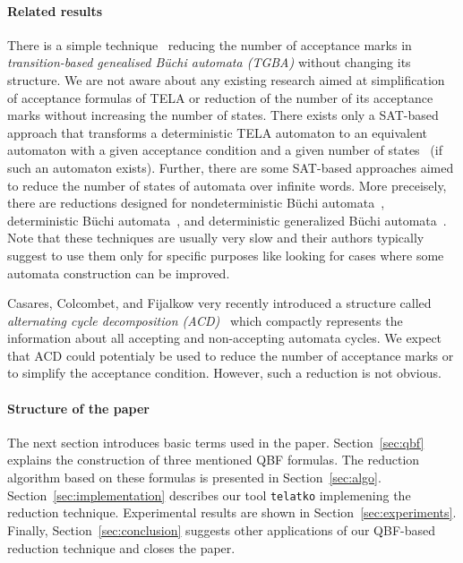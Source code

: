\documentclass[a4paper,UKenglish,cleveref,autoref,thm-restate]{lipics-v2021}
\newcommand{\telatko}{\texttt{telatko}\xspace}
\begin{document}
\paragraph*{Related results}
There is a simple technique~\cite{babiak.13.spin} reducing the number
of acceptance marks in \emph{transition-based genealised Büchi
  automata (TGBA)} without changing its structure. We are not aware
about any existing research aimed at simplification of acceptance
formulas of TELA or reduction of the number of its acceptance marks
without increasing the number of states. There exists only a SAT-based
approach that transforms a deterministic TELA automaton to an
equivalent automaton with a given acceptance condition and a given
number of states~\cite{baarir.15.lpar} (if such an automaton
exists). Further, there are some SAT-based approaches aimed to reduce
the number of states of automata over infinite words. More preceisely,
there are reductions designed for nondeterministic Büchi
automata~\cite{ehlers.10.spin}, deterministic Büchi
automata~\cite{ehlers.10.sat}, and deterministic generalized Büchi
automata~\cite{baarir.14.forte}. Note that these techniques are
usually very slow and their authors typically suggest to use them only
for specific purposes like looking for cases where some automata
construction can be improved.

Casares, Colcombet, and Fijalkow very recently introduced a structure
called \emph{alternating cycle decomposition
  (ACD)}~\cite{casares.21.icalp} which compactly represents the
information about all accepting and non-accepting automata cycles. We
expect that ACD could potentialy be used to reduce the number of
acceptance marks or to simplify the acceptance condition. However,
such a reduction is not obvious.

\paragraph*{Structure of the paper} The next section introduces basic
terms used in the paper. Section~\ref{sec:qbf} explains the
construction of three mentioned QBF formulas. The reduction algorithm
based on these formulas is presented in
Section~\ref{sec:algo}. Section~\ref{sec:implementation} describes our
tool \telatko implemening the reduction technique.
Experimental results are shown in
Section~\ref{sec:experiments}. Finally, Section~\ref{sec:conclusion}
suggests other applications of our QBF-based reduction technique and
closes the paper.
\end{document}
